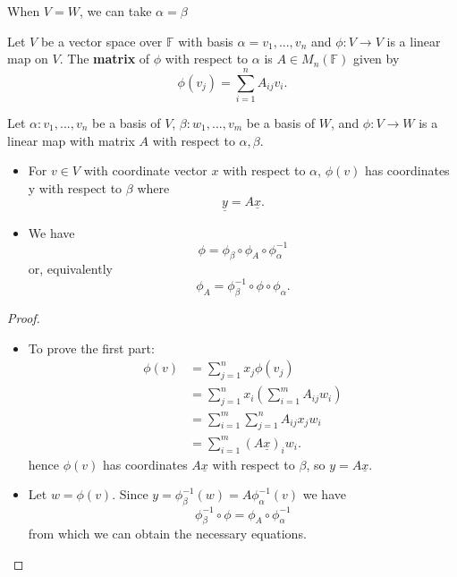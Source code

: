When $V = W$, we can take $\alpha = \beta$

\begin{definition}
  Let $V$ be a vector space over $\mathbb{F}$ with basis $\alpha = v_1,...,v_n$ and $\phi : V \rightarrow V$ is a linear map on $V$. The {\bf matrix} of $\phi$ with respect to $\alpha$ is $A \in M_n(\mathbb{F})$ given by
    \[\phi(v_j) = \sum_{i = 1}^n A_{ij} v_i.\]
\end{definition}

\begin{prop}
  Let $\alpha : v_1, ..., v_n$ be a basis of $V$, $\beta : w_1, ..., v_m$ be a basis of $W$, and $\phi: V \rightarrow W$ is a linear map with matrix $A$ with respect to $\alpha, \beta$.
  \begin{itemize}
    \item For $v \in V$ with coordinate vector $x$ with respect to $\alpha$, $\phi(v)$ has coordinates y with respect to $\beta$ where
      \[\underline{y} = A \underline{x}.\]
    \item We have
      \[\phi = \phi_\beta \circ \phi_A \circ \phi_\alpha^{-1}\]
      or, equivalently
      \[\phi_A = \phi_\beta^{-1} \circ \phi \circ \phi_{\alpha}.\]
      
  \end{itemize}
    
\end{prop}
\begin{proof} $ $
  \begin{itemize}
    \item To prove the first part:
      \begin{align*}
        \phi(v) &= \sum_{j = 1}^n x_j \phi(v_j) \\
                &= \sum_{ j = 1}^{n} x_i (\sum_{ i = 1}^{m} A_{ij} w_i) \\
                &= \sum_{ i = 1}^{m} \sum_{ j = 1}^{n} A_{ij} x_j w_i \\
                &= \sum_{ i = 1}^{m} (A \underline{x})_i w_i
      .\end{align*}
      hence $\phi(v)$ has coordinates $A \underline{x}$ with respect to $\beta$, so $y = A \underline{x}$.
    \item Let $w = \phi(v)$. Since $y = \phi_{\beta}^{-1}(w) = A \phi_\alpha^{-1}(v)$ we have
      \[\phi_\beta^{-1} \circ \phi = \phi_A \circ \phi_\alpha^{-1}\]
      from which we can obtain the necessary equations.
  \end{itemize}
\end{proof}

